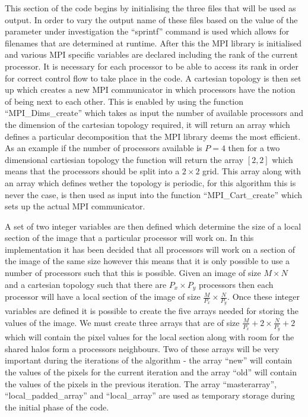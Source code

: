 \documentclass[12pt]{article}
\begin{document}
This section of the code begins by initialising the three files that will be used as output. In order to vary the output name of these files based on the value of the parameter under investigation the ``sprintf'' command is used which allows for filenames that are determined at runtime. After this the MPI library is initialised and various MPI specific variables are declared including the rank of the current processor. It is necessary for each processor to be able to access its rank in order for correct control flow to take place in the code. A cartesian topology is then set up which creates a new MPI communicator in which processors have the notion of being next to each other. This is enabled by using the function ``MPI\_Dims\_create'' which takes as input the number of available processors and the dimension of the cartesian topology required, it will return an array which defines a particular decomposition that the MPI library deems the most efficient. As an example if the number of processors available is $P=4$ then for a two dimensional cartiesian topology the function will return the array $[2,2]$ which means that the processors should be split into a $2\times2$ grid. This array along with an array which defines wether the topology is periodic, for this algorithm this is never the case,  is then used as input into the function ``MPI\_Cart\_create'' which sets up the actual MPI communicator. 

A set of two integer variables are then defined which determine the size of a local section of the image that a particular processor will work on. In this implementation it has been decided that all processors will work on a section of the image of the same size however this means that it is only possible to use a number of processors such that this is possible. Given an image of size $M\times N$ and a cartesian topology such that there are $P_x \times P_y$  processors then each processor will have a local section of the image of size $\frac{M}{P_x}\times\frac{N}{P_y}$. Once these integer variables are defined it is possible to create the five arrays needed for storing the values of the image. We must create three arrays that are of size $\frac{M}{P_x} + 2\times\frac{N}{P_y}+2$ which will contain the pixel values for the local section along with room for the shared halos form a processors neighbours. Two of these arrays will be very important during the iterations of the algorithm - the array ``new'' will contain the values of the pixels for the current iteration and the array ``old'' will contain the values of the pixels in the previous iteration. The array ``masterarray'', ``local\_padded\_array'' and ``local\_array'' are used as temporary storage during the initial phase of the code.
\end{document}
